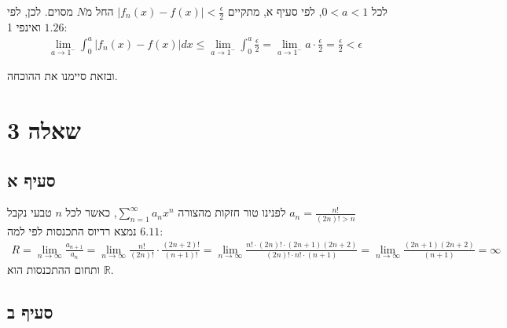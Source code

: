 \documentclass{article}
\def\reals{\mathbb{R}}
\begin{document}
            לכל $0<a<1$, לפי סעיף א, מתקיים $|f_n(x)-f(x)|<\frac{\epsilon}{2}$ החל מ$N$ מסוים.
            לכן, לפי $1.26$ ואינפי 1:
            \begin{align*}
                \lim_{a\rightarrow 1^-} \int_0^a |f_n(x)-f(x)|dx \leq
                \lim_{a\rightarrow 1^-} \int_0^a \frac{\epsilon}{2} =
                \lim_{a\rightarrow 1^-} a \cdot \frac{\epsilon}{2} = \frac{\epsilon}{2} < \epsilon
            \end{align*}

            ובזאת סיימנו את ההוכחה.

            \pagebreak

            \section*{שאלה 3}

            \subsection*{סעיף א}

            לפנינו טור חזקות מהצורה $\sum_{n=1}^\infty a_nx^n$, כאשר לכל $n$ טבעי נקבל $a_n=\frac{n!}{(2n)!>n}$ \\
            נמצא רדיוס התכנסות לפי למה $6.11$:
            \begin{align*}
                R=\lim_{n\rightarrow\infty} \frac{a_{n+1}}{a_n} =
                \lim_{n\rightarrow\infty} \frac{n!}{(2n)!} \cdot \frac{(2n+2)!}{(n+1)!} =
                \lim_{n\rightarrow\infty} \frac{n!\cdot (2n)! \cdot  (2n+1) (2n+2)}{(2n)! \cdot n!\cdot  (n+1)} =
                \lim_{n\rightarrow\infty} \frac{(2n+1) (2n+2)}{(n+1)} = \infty
            \end{align*}
            ותחום ההתכנסות הוא $\reals$.

            \subsection*{סעיף ב}
\end{document}
